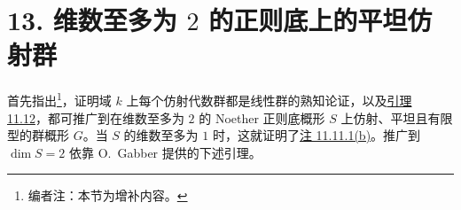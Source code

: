 

\section*{13. 维数至多为 \(2\) 的正则底上的平坦仿射群}
\label{sec:sga3-VIB-13}%

首先指出\footnote{\label{note:sga3-VIB-139}%
编者注：本节为增补内容。}，证明域 \(k\) 上每个仿射代数群都是线性群的熟知论证，以及\hyperref[lem:sga3-VIB-11.12]{引理 11.12}，都可推广到在维数至多为 \(2\) 的 Noether 正则底概形 \(S\) 上仿射、平坦且有限型的群概形 \(G\)。当 \(S\) 的维数至多为 \(1\) 时，这就证明了\hyperref[concl:sga3-VIB-11.11.1-b]{注 11.11.1(b)}。推广到 \(\dim S=2\) 依靠 O.~Gabber 提供的下述引理。


